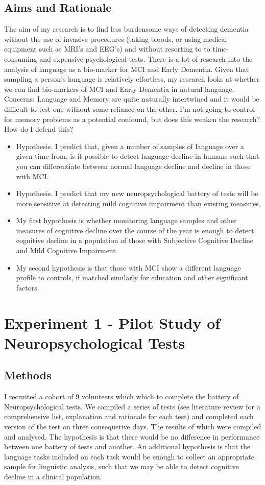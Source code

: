 \documentclass{article}
\begin{document}
\subsection{Aims and Rationale}
The aim of my research is to find less burdensome ways of detecting dementia without the use of invasive procedures (taking bloods, or using medical equipment such as MRI's and EEG's) and without resorting to to time-consuming and expensive psychological tests. There is a lot of research into the analysis of language as a bio-marker for MCI and Early Dementia. Given that sampling a person's language is relatively effortless, my research looks at whether we can find bio-markers of MCI and Early Dementia in natural language.\newline
Concerns: Language and Memory are quite naturally intertwined and it would be difficult to test one without some reliance on the other. I'm not going to control for memory problems as a potential confound, but does this weaken the research? How do I defend this? \newline
\begin{itemize}
	\item Hypothesis. I predict that, given a number of samples of language over a given time from, is it possible to detect language decline in humans such that you can differentiate between normal language decline and decline in those with MCI.
	\item Hypothesis. I predict that my new neuropsychological battery of tests will be more sensitive at detecting mild cognitive impairment than existing measures.
	\item My first hypothesis is whether monitoring language samples and other measures of cognitive decline over the course of the year is enough to detect cognitive decline in a population of those with Subjective Cognitive Decline and Mild Cognitive Impairment.
	\item My second hypothesis is that those with MCI show a different language profile to controls, if matched similarly for education and other significant factors.
\end{itemize}	
\section{Experiment 1 - Pilot Study of Neuropsychological Tests}
\subsection{Methods}
I recruited a cohort of 9 volunteers which which to complete the battery of Neuropsychological tests. We compiled a series of tests (see literature review for a comprehensive list, explanation and rationale for each test) and completed each version of the test on three consequetive days. The results of which were compiled and analysed. The hypothesis is that there would be no difference in performance between one battery of tests and another. An additional hypothesis is that the language tasks included on each task would be enough to collect an appropriate sample for linguistic analysis, such that we may be able to detect cognitive decline in a clinical population. \newline
\par
\end{document}

